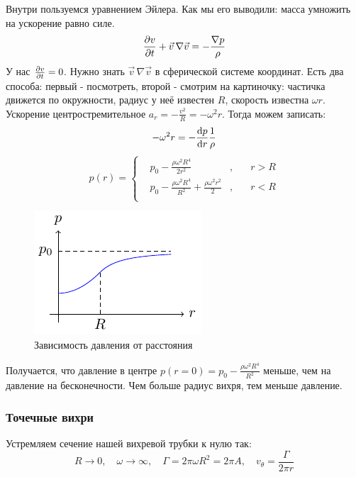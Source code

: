 Внутри пользуемся уравнением Эйлера. Как мы его выводили: масса умножить на ускорение равно силе.
\begin{equation}
	\pdv{v}{t}+\vec{v}\,\nabla\vec{v}=-\frac{\nabla p}{\rho}
\end{equation}
У нас $\pdv{v}{t}=0$. Нужно знать $\vec{v}\,\nabla\vec{v}$ в сферической системе координат. Есть два способа: первый - посмотреть, второй - смотрим на картиночку: частичка движется по окружности, радиус у неё известен $R$, скорость известна $\omega r$. Ускорение центростремительное $a_r=-\frac{v^2}{R}=-\omega^2 r$. Тогда можем записать:
\begin{equation}
	-\omega^2 r  = - \dv{p}{r}\frac{1}{\rho}
\end{equation}
\begin{equation}
	p(r)=\left\{
	\begin{aligned}
		&p_0-\frac{\rho\omega^2 R^4}{2r^2}&, \quad& r>R\\
		&p_0-\frac{\rho\omega^2 R^4}{R^2}+\frac{\rho\omega^2 r^2}{2}&, \quad& r<R\\
	\end{aligned}
	\right.
\end{equation}
\begin{figure}[H]
    \centering
    \includegraphics[scale=1.5]{img/pr}
    \caption{Зависимость давления от расстояния}
    \label{fig:figure1}
\end{figure}
Получается, что давление в центре $p(r=0)=p_0-\frac{\rho\omega^2 R^4}{R^2}$ меньше, чем на давление на бесконечности. Чем больше радиус вихря, тем меньше давление.




\subsubsection{Точечные вихри}

Устремляем сечение нашей вихревой трубки к нулю так:
\begin{equation}
	R\to0, \quad \omega\to\infty, \quad 
	\Gamma=2\pi \omega R^2 =2\pi A, 
	\quad v_\theta=\frac{\Gamma}{2\pi r}
\end{equation}

